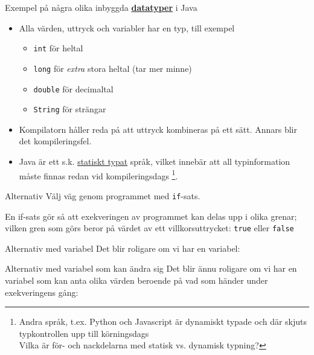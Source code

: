 \documentclass{lecturenotes}
\begin{document}
\begin{Slide}{Exempel på några olika inbyggda \href{https://sv.wikipedia.org/wiki/Datatyp}{\textbf{datatyper}} i Java}
\begin{itemize}
\item Alla värden, uttryck och variabler har en typ, till exempel 
\begin{itemize}\footnotesize
\item \lstinline{int} för heltal 
\item \lstinline{long} för \textit{extra} stora heltal (tar mer minne)
\item \lstinline{double} för decimaltal
\item \lstinline{String} för strängar
\end{itemize}
\item Kompilatorn håller reda på att uttryck kombineras på ett  sätt. Annars blir det kompileringsfel.
\item Java är ett s.k. \href{https://sv.wikipedia.org/wiki/Typsystem}{statiskt typat} språk, vilket innebär att all typinformation måste finnas redan vid kompileringsdags \footnote{Andra språk, t.ex. Python och Javascript är dynamiskt typade och där skjuts typkontrollen upp till körningsdags  \\ Vilka är för- och nackdelarna med statisk vs. dynamisk typning?}. 
\end{itemize}
\end{Slide}

\begin{Slide}{Alternativ}
\footnotesize
Välj väg genom programmet med \lstinline{if}-sats.

En if-sats gör så att exekveringen av programmet kan delas upp i olika grenar; vilken gren som görs beror på värdet av ett villkorsuttrycket: \lstinline{true} eller \lstinline{false}   
\end{Slide}

\begin{Slide}{Alternativ med variabel}
\footnotesize
Det blir roligare om vi har en variabel:

\end{Slide}

\begin{Slide}{Alternativ med variabel som kan ändra sig}
\footnotesize
Det blir ännu roligare om vi har en variabel som kan anta olika värden beroende på vad som händer under exekveringens gång:

\end{Slide}
\end{document}
